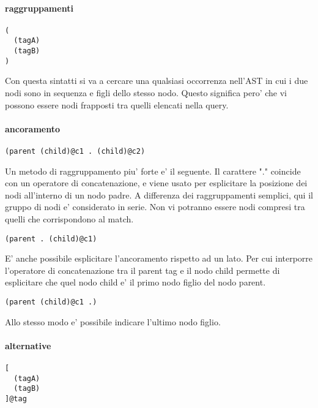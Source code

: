 \paragraph{raggruppamenti}

\begin{verbatim}
(
  (tagA)
  (tagB)
)
\end{verbatim}

Con questa sintatti si va a cercare una qualsiasi occorrenza nell'AST in cui i due nodi sono in sequenza e figli dello stesso nodo.
Questo significa pero' che vi possono essere nodi frapposti tra quelli elencati nella query.

\paragraph{ancoramento}

\begin{verbatim}
(parent (child)@c1 . (child)@c2)
\end{verbatim}

Un metodo di raggruppamento piu' forte e' il seguente.
Il carattere "." coincide con un operatore di concatenazione, e viene usato per esplicitare la posizione dei nodi all'interno di un nodo padre.
A differenza dei raggruppamenti semplici, qui il gruppo di nodi e' considerato in serie.
Non vi potranno essere nodi compresi tra quelli che corrispondono al match.

\begin{verbatim}
(parent . (child)@c1)
\end{verbatim}

E' anche possibile esplicitare l'ancoramento rispetto ad un lato.
Per cui interporre l'operatore di concatenazione tra il parent tag e il nodo child permette di esplicitare che quel nodo child e' il primo nodo figlio del nodo parent.

\begin{verbatim}
(parent (child)@c1 .)
\end{verbatim}

Allo stesso modo e' possibile indicare l'ultimo nodo figlio.

\paragraph{alternative}

\begin{verbatim}
[
  (tagA)
  (tagB)
]@tag
\end{verbatim}

